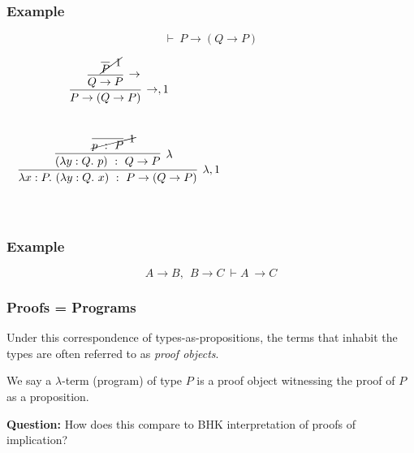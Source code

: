 \documentclass{beamer}
\theoremstyle{indentDefn} \newtheorem{defn}[]{Definition}
\begin{document}
\begin{frame}
  \frametitle{Example}

  $$ \vdash \ P \to (Q \to P)$$

  \vspace{1cm}

  \begin{center}
    $\begin{array}{c}
      
      \begin{array}{c}
        \infer[\to, 1]{P \to (Q \to P)}
          {\infer[\to]{Q \to P}
            {\cancel{\infer[1]{P}{}}}}
      \end{array}

      \vspace{1cm}

      \\
      
      \vspace{1cm}

      \begin{array}{c}
        \infer[\lambda, 1]{\lambda x : P. \ (\lambda y : Q. \ x) \ : \ P \to (Q \to P)}
          {\infer[\lambda]{(\lambda y : Q. \ p) \ : \ Q \to P}
            {\cancel{\infer[1]{p \ : \ P}{}}}}
      \end{array}

    \end{array}$
  \end{center}
\end{frame}

\begin{frame}
  \frametitle{Example}

  $$ A \to B, \ \ B \to C \ \vdash A \ \to C$$

  \vspace{6.5cm}
\end{frame}





\begin{frame}
  \frametitle{Proofs = Programs}

  Under this correspondence of types-as-propositions, the terms that inhabit the types are often referred to as \emph{proof objects}.

  We say a $\lambda$-term (program) of type $P$ is a proof object witnessing the proof of $P$ as a proposition.

  {\bf Question:} How does this compare to BHK interpretation of proofs of implication?

  \vspace{3cm}
\end{frame}
\end{document}
